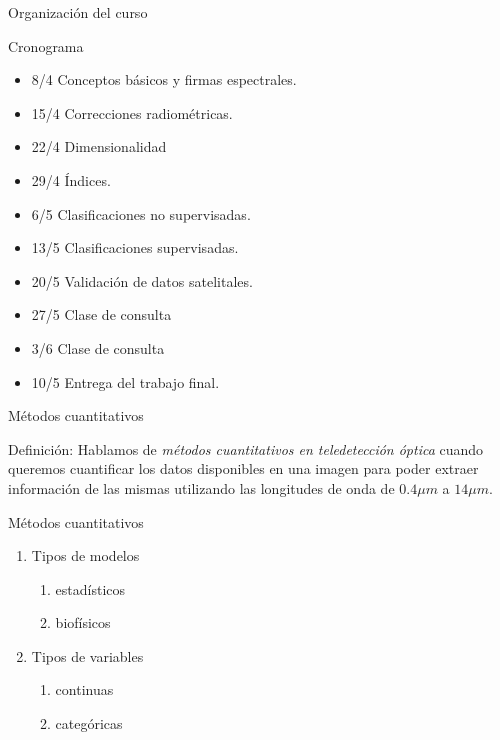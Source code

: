 \documentclass[handout]{beamer}
\begin{document}
\begin{frame}[fragile]{Organizaci\'on del curso}
  \begin{block}{Cronograma}
    \begin{itemize}[<+>]
      \item 8/4 Conceptos b\'asicos y firmas espectrales.
      \item 15/4 Correcciones radiom\'etricas.
      \item 22/4 Dimensionalidad 
      \item 29/4 \'Indices.
      \item 6/5 Clasificaciones no supervisadas.
      \item 13/5 Clasificaciones supervisadas.
      \item 20/5 Validaci\'on de datos satelitales.
      \item 27/5 Clase de consulta
      \item 3/6  Clase de consulta
      \item 10/5 Entrega del trabajo final.
    \end{itemize}
  \end{block}
\end{frame}

\begin{frame}{M\'etodos cuantitativos}
  \begin{block}{Definici\'on:}
    Hablamos de \emph{m\'etodos cuantitativos en teledetecci\'on \'optica} cuando queremos cuantificar los datos disponibles en una imagen para poder extraer informaci\'on de las mismas utilizando las longitudes de onda de $0.4\mu m$ a $14 \mu m$.
  \end{block}
\end{frame}

\begin{frame}{M\'etodos cuantitativos}
  \begin{enumerate}
    \item<1-3> Tipos de modelos
    \begin{enumerate}
      \item<2-3> estad\'isticos
      \item<3> biofísicos
    \end{enumerate}
    \item<4-6> Tipos de variables
    \begin{enumerate}
      \item<5-6> continuas
      \item<6> categ\'oricas
    \end{enumerate}
  \end{enumerate}
\end{frame}
\end{document}
